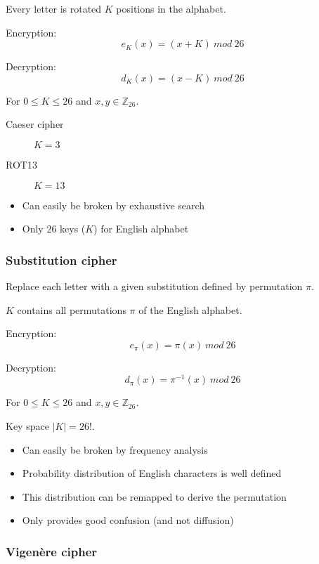 \documentclass[a4paper]{article}
\begin{document}
Every letter is rotated $K$ positions in the alphabet.

Encryption:
\[
  e_{K}(x) = (x + K) \: mod \: 26
\]

Decryption:
\[
  d_{K}(x) = (x - K) \: mod \: 26
\]

For $0 \leq K \leq 26$ and $x, y \in \mathbb{Z}_{26}$.

\begin{description}
  \item[Caeser cipher]
    $K=3$
  \item[ROT13]
    $K=13$
\end{description}


\begin{itemize}
  \item Can easily be broken by exhaustive search
  \item Only 26 keys ($K$) for English alphabet
\end{itemize}

\subsubsection{Substitution cipher}

Replace each letter with a given substitution defined by permutation $\pi$.

$K$ contains all permutations $\pi$ of the English alphabet.

Encryption:
\[
  e_{\pi}(x) = \pi(x) \: mod \: 26
\]

Decryption:
\[
  d_{\pi}(x) = \pi^{-1}(x) \: mod \: 26
\]

For $0 \leq K \leq 26$ and $x, y \in \mathbb{Z}_{26}$.

Key space $|K| = 26!$.


\begin{itemize}
  \item Can easily be broken by frequency analysis
  \item Probability distribution of English characters is well defined
  \item This distribution can be remapped to derive the permutation
  \item Only provides good confusion (and not diffusion)
\end{itemize}

\subsubsection{Vigen\`ere cipher}
\end{document}
